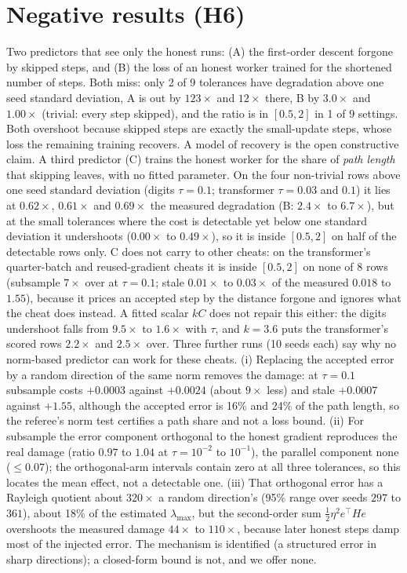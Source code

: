 \documentclass[sigconf,anonymous]{acmart}
\begin{document}
\section{Negative results (H6)}\label{sec:neg}
Two predictors that see only the honest runs: (A) the first-order descent forgone by skipped steps, and (B) the loss of an
honest worker trained for the shortened number of steps. Both miss: only 2 of 9 tolerances have degradation above one seed
standard deviation, A is out by $123\times$ and $12\times$ there, B by $3.0\times$ and $1.00\times$ (trivial: every step skipped),
and the ratio is in $[0.5,2]$ in 1 of 9 settings. Both overshoot because skipped steps are exactly the small-update steps,
whose loss the remaining training recovers. A model of recovery is the open constructive claim.
A third predictor (C) trains the honest worker for the share of \emph{path length} that skipping leaves, with no fitted parameter.
On the four non-trivial rows above one seed standard deviation (digits $\tau=0.1$; transformer $\tau=0.03$ and $0.1$) it lies at $0.62\times$,
$0.61\times$ and $0.69\times$ the measured degradation (B: $2.4\times$ to $6.7\times$), but at the small tolerances where the cost is
detectable yet below one standard deviation it undershoots ($0.00\times$ to $0.49\times$), so it is inside $[0.5,2]$ on half of the detectable rows only.
C does not carry to other cheats: on the transformer's quarter-batch and reused-gradient cheats it is inside $[0.5,2]$ on none of 8 rows
(subsample $7\times$ over at $\tau=0.1$; stale $0.01\times$ to $0.03\times$ of the measured $0.018$ to $1.55$), because it prices an accepted
step by the distance forgone and ignores what the cheat does instead. A fitted scalar $kC$ does not repair this either: the digits undershoot falls from $9.5\times$
to $1.6\times$ with $\tau$, and $k=3.6$ puts the transformer's scored rows $2.2\times$ and $2.5\times$ over.
Three further runs (10 seeds each) say why no norm-based predictor can work for these cheats. (i) Replacing the accepted error by a random direction of the same norm removes the damage: at $\tau=0.1$ subsample costs $+0.0003$ against $+0.0024$ (about $9\times$ less) and stale $+0.0007$ against $+1.55$, although the accepted error is 16\% and 24\% of the path length, so the referee's norm test certifies a path share and not a loss bound. (ii) For subsample the error component orthogonal to the honest gradient reproduces the real damage (ratio $0.97$ to $1.04$ at $\tau=10^{-2}$ to $10^{-1}$), the parallel component none ($\le 0.07$); the orthogonal-arm intervals contain zero at all three tolerances, so this locates the mean effect, not a detectable one. (iii) That orthogonal error has a Rayleigh quotient about $320\times$ a random direction's (95\% range over seeds $297$ to $361$), about 18\% of the estimated $\lambda_{\max}$, but the second-order sum $\tfrac12\eta^2 e^{\top}He$ overshoots the measured damage $44\times$ to $110\times$, because later honest steps damp most of the injected error. The mechanism is identified (a structured error in sharp directions); a closed-form bound is not, and we offer none.
\end{document}
